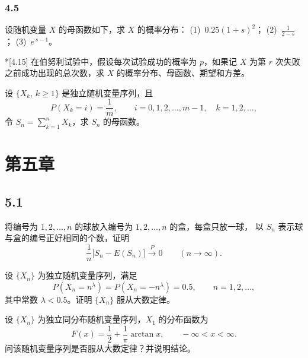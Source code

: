 \subsection{4.5}
\begin{homework}[4.14]
设随机变量 $X$ 的母函数如下，求 $X$ 的概率分布：  
(1)\ $0.25(1+s)^2$；  
(2)\ $\displaystyle \frac{1}{2-s}$；  
(3)\ $e^{\,s-1}$。
\end{homework}

\begin{homework}*[4.15]
在伯努利试验中，假设每次试验成功的概率为 $p$，如果记 $X$ 为第 $r$ 次失败之前成功出现的总次数，求 $X$ 的概率分布、母函数、期望和方差。
\end{homework}

\begin{homework}[4.16]
设 $\{X_k,\,k\ge 1\}$ 是独立随机变量序列，且
\[
P(X_k=i)=\frac{1}{m},\qquad i=0,1,2,\ldots,m-1,\quad k=1,2,\ldots,
\]
令 $S_n=\sum_{k=1}^{n} X_k$，求 $S_n$ 的母函数。
\end{homework}
\chapter{第五章}
\section{5.1}

\begin{homework}[5.3]
将编号为 $1,2,\ldots,n$ 的球放入编号为 $1,2,\ldots,n$ 的盒，每盒只放一球，
以 $S_n$ 表示球与盒的编号正好相同的个数，证明
\[
\frac1n \bigl[S_n - E(S_n)\bigr] \xrightarrow{P} 0 
\qquad (n\to\infty).
\]
\end{homework}


\begin{homework}[5.4]
设 $\{X_n\}$ 为独立随机变量序列，满足
\[
P(X_n = n^\lambda) = P(X_n = -n^\lambda) = 0.5 , \qquad n=1,2,\ldots,
\]
其中常数 $\lambda<0.5$。证明 $\{X_n\}$ 服从大数定律。
\end{homework}


\begin{homework}[5.5]
设 $\{X_n\}$ 为独立同分布随机变量序列，$X_1$ 的分布函数为
\[
F(x)=\frac12 + \frac1\pi \arctan x , \qquad -\infty < x < \infty .
\]
问该随机变量序列是否服从大数定律？并说明结论。
\end{homework}

